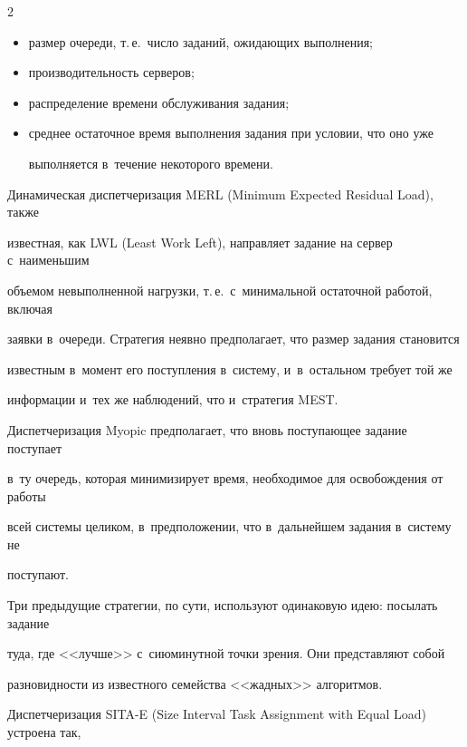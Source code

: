 \begin{multicols}{2}
\begin{itemize}
    \item размер очереди, т.\,е.\ число заданий, ожидающих выполнения;


    \item производительность серверов;


    \item распределение времени обслуживания задания;


    \item среднее остаточное время выполнения задания при условии, что оно уже 


выполняется в~течение некоторого времени.


    \end{itemize}


    


    Динамическая диспетчеризация MERL (Minimum Expected Residual Load), также 


известная, как LWL (Least Work Left), направляет задание на сервер с~наименьшим 


объемом невыполненной нагрузки, т.\,е.\ с~минимальной остаточной работой, включая 


заявки в~очереди. Стратегия неявно предполагает, что размер задания становится 


известным в~момент его поступления в~систему, и~в~остальном требует той же 


информации и~тех же наблюдений, что и~стратегия MEST.


    


    Диспетчеризация Myopic предполагает, что вновь поступающее задание поступает 


в~ту очередь, которая минимизирует время, необходимое для освобождения от работы 


всей системы целиком, в~предположении, что в~дальнейшем задания в~систему не 


поступают.


    


    Три предыдущие стратегии, по сути, используют одинаковую идею: посылать задание 


туда, где <<лучше>> с~сиюминутной точки зрения. Они представляют собой 


разновидности из известного семейства <<жадных>> алгоритмов.


    


    Диспетчеризация SITA-E (Size Interval Task Assignment with Equal Load) устроена так, 



\end{multicols}
